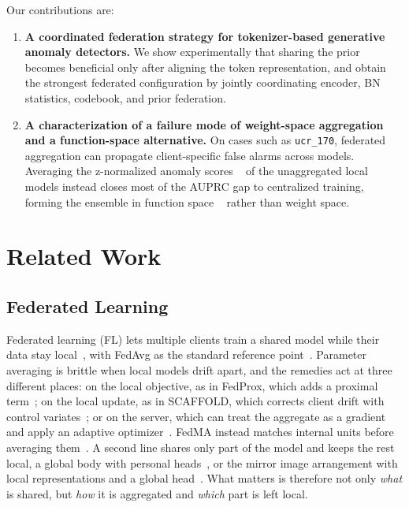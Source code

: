 \documentclass[conference]{IEEEtran}
\begin{document}
Our contributions are:

\begin{enumerate}

\item \textbf{A coordinated federation strategy for tokenizer-based generative anomaly
detectors.}
We show experimentally that sharing the prior becomes beneficial only after aligning the
token representation, and obtain the strongest federated configuration by jointly
coordinating encoder, BN statistics, codebook, and prior federation.

\item \textbf{A characterization of a failure mode of weight-space aggregation and a
function-space alternative.}
On cases such as \texttt{ucr\_170}, federated aggregation can propagate client-specific
false alarms across models. Averaging the z-normalized anomaly scores
~\cite{kriegel2011unifying} of the unaggregated local models instead closes most of the AUPRC
gap to centralized training, forming the ensemble in function space
~\cite{aggarwal2015outlierensembles,lin2020feddf} rather than weight space.

\end{enumerate}

\section{Related Work}

\subsection{Federated Learning}

Federated learning (FL) lets multiple clients train a shared model while their data stay
local~\cite{kairouz2021advances}, with FedAvg as the standard reference
point~\cite{mcmahan2017federated}. Parameter averaging is brittle when local models drift
apart, and the remedies act at three different places: on the local objective, as in FedProx,
which adds a proximal term~\cite{li2020fedprox}; on the local update, as in SCAFFOLD, which
corrects client drift with control variates~\cite{karimireddy2020scaffold}; or on the server,
which can treat the aggregate as a gradient and apply an adaptive
optimizer~\cite{reddi2021adaptive}. FedMA instead matches internal units before averaging
them~\cite{wang2020fedma}. A second line shares only part of the model and keeps
the rest local, a global body with personal heads~\cite{arivazhagan2019fedper,collins2021fedrep},
or the mirror image arrangement with local representations and a global
head~\cite{liang2020lgfedavg}. What matters is therefore not only \emph{what} is shared,
but \emph{how} it is aggregated and \emph{which} part is left local.
\end{document}
